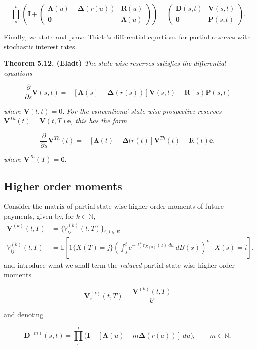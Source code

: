 \documentclass[a4paper,12pt,openany]{book}
\begin{document}
\[
\prod_s^t\left(\mathbf I+
\begin{pmatrix}
\mathbf \Lambda(u)-\mathbf \Delta (r(u)) & \mathbf R(u)\\
\mathbf 0 & \mathbf \Lambda(u)
\end{pmatrix}
\right)=\begin{pmatrix}
\mathbf D(s,t) & \mathbf V(s,t)\\
\mathbf 0 & \mathbf P(s,t)
\end{pmatrix}.
\]

Finally, we state and prove Thiele's differential equations for partial reserves with stochastic interest rates.

\textbf{Theorem 5.12. (Bladt)} \emph{The state-wise reserves satisfies the differential equations}

\[
\frac{\partial}{\partial s}\mathbf V(s,t)=-[\mathbf \Lambda(s) - \mathbf\Delta(r(s))]\mathbf V(s,t) - \mathbf R(s)\mathbf P(s,t)
\]

\emph{where \(\mathbf V(t,t)=0\). For the conventional state-wise prospective reserves \(\mathbf V^{Th}(t)=\mathbf V(t,T)\mathbf e\), this has the form}

\[
\frac{\partial}{\partial s}\mathbf V^{Th}(t)=-[\mathbf \Lambda(t) - \mathbf\Delta(r(t)]\mathbf V^{Th}(t) - \mathbf R(t)\mathbf e,
\]

\emph{where \(\mathbf V^{Th}(T)=\mathbf 0\).}

\hypertarget{higher-order-moments}{%
\subsection{Higher order moments}\label{higher-order-moments}}

Consider the matrix of partial state-wise higher order moments of future payments, given by, for \(k\in\mathbb N\),
\begin{align*}
\mathbf V^{(k)}(t,T)&=\Big\{V_{ij}^{(k)}(t,T)\Big\}_{i,j\in E}\\
V_{ij}^{(k)}(t,T)&=\mathbb E\left[\left.1\{X(T)=j\}\left(\int_s^te^{-\int_s^xr_{X(u)}(u)\ du}\ dB(x)\right)^k \ \right\vert\ X(s)=i\right],
\end{align*}
and introduce what we shall term the \emph{reduced} partial state-wise higher order moments:

\[
\mathbf V_r^{(k)}(t,T)=\frac{\mathbf V^{(k)}(t,T)}{k!}
\]

and denoting

\[
\mathbf D^{(m)}(s,t)=\prod_s^t\Big(\mathbf I + [\mathbf\Lambda(u)-m\mathbf\Delta(r(u))]\ du\Big),\qquad m\in\mathbb N,
\]
\end{document}
